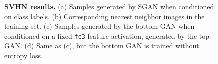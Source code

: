 \documentclass[10pt,twocolumn,letterpaper]{article}
\begin{document}
\begin{figure}[!htbp]
	\caption{{\bf SVHN results.} 
(a) Samples generated by SGAN when conditioned on class labels. (b) Corresponding nearest neighbor images in the training set. (c) Samples generated by the bottom GAN when conditioned on a fixed \texttt{fc3} feature activation, generated by the top GAN. (d) Same as (c), but the bottom GAN is trained without entropy loss.} 
 	\label{fig:svhn}
 	 \vspace{-0.2cm}
 \end{figure}
 
\end{document}
